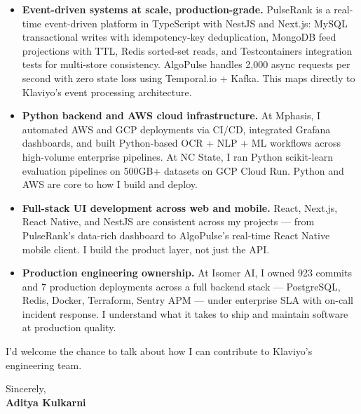 \documentclass[11pt]{article}
\begin{document}
\begin{itemize}[leftmargin=1.2em, itemsep=4pt]
  \item[\textcolor{KlaviyoGreen}{\faAngleRight}] \textbf{Event-driven systems at scale, production-grade.} PulseRank is a real-time event-driven platform in TypeScript with NestJS and Next.js: MySQL transactional writes with idempotency-key deduplication, MongoDB feed projections with TTL, Redis sorted-set reads, and Testcontainers integration tests for multi-store consistency. AlgoPulse handles 2,000 async requests per second with zero state loss using Temporal.io + Kafka. This maps directly to Klaviyo's event processing architecture.
  \item[\textcolor{KlaviyoGreen}{\faAngleRight}] \textbf{Python backend and AWS cloud infrastructure.} At Mphasis, I automated AWS and GCP deployments via CI/CD, integrated Grafana dashboards, and built Python-based OCR + NLP + ML workflows across high-volume enterprise pipelines. At NC State, I ran Python scikit-learn evaluation pipelines on 500GB+ datasets on GCP Cloud Run. Python and AWS are core to how I build and deploy.
  \item[\textcolor{KlaviyoGreen}{\faAngleRight}] \textbf{Full-stack UI development across web and mobile.} React, Next.js, React Native, and NestJS are consistent across my projects — from PulseRank's data-rich dashboard to AlgoPulse's real-time React Native mobile client. I build the product layer, not just the API.
  \item[\textcolor{KlaviyoGreen}{\faAngleRight}] \textbf{Production engineering ownership.} At Isomer AI, I owned 923 commits and 7 production deployments across a full backend stack — PostgreSQL, Redis, Docker, Terraform, Sentry APM — under enterprise SLA with on-call incident response. I understand what it takes to ship and maintain software at production quality.
\end{itemize}

\vspace{8pt}

I'd welcome the chance to talk about how I can contribute to Klaviyo's engineering team.

\vspace{10pt}

Sincerely, \\[4pt]
\textbf{Aditya Kulkarni}
\end{document}
